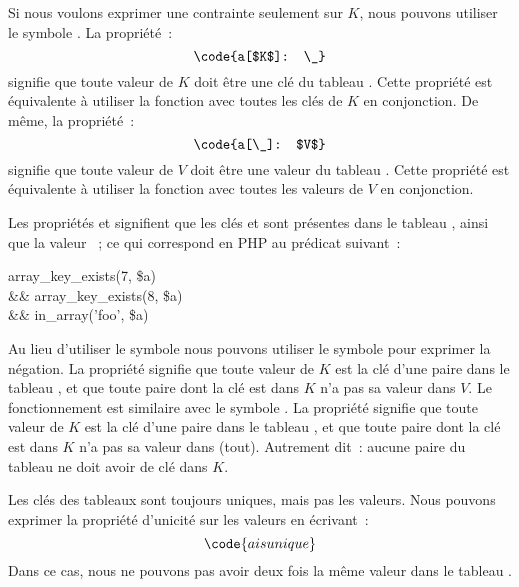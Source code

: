 Si nous voulons exprimer une contrainte seulement sur $K$, nous pouvons utiliser
le symbole \code{\_}. La propriété~:
%
$$\code{a[$K$]: \_}$$
%
signifie que toute valeur de $K$ doit être une clé du tableau . Cette
propriété est équivalente à utiliser la fonction  avec
toutes les clés de $K$ en conjonction.  De même, la propriété~:
%
$$\code{a[\_]: $V$}$$
%
signifie que toute valeur de $V$ doit être une valeur du tableau . Cette
propriété est équivalente à utiliser la fonction  avec toutes
les valeurs de $V$ en conjonction.

\begin{example}

Les propriétés  et  signifient que les clés
 et  sont présentes dans le tableau , ainsi que la
valeur ~; ce qui correspond en PHP au prédicat suivant~:
%
\begin{pre}
   array\_key\_exists(7, \$a) \\
\&\& array\_key\_exists(8, \$a) \\
\&\& in\_array('foo', \$a)
\end{pre}

\end{example}

Au lieu d'utiliser le symbole \code{:} nous pouvons utiliser le symbole
\code{!:} pour exprimer la négation. La propriété  signifie
que toute valeur de $K$ est la clé d'une paire dans le tableau , et que
toute paire dont la clé est dans $K$ n'a pas sa valeur dans $V$. Le
fonctionnement est similaire avec le symbole \code{\_}. La propriété
 signifie que toute valeur de $K$ est la clé d'une paire dans
le tableau , et que toute paire dont la clé est dans $K$ n'a pas sa
valeur dans \code{\_} (tout). Autrement dit~: aucune paire du tableau 
ne doit avoir de clé dans $K$.

Les clés des tableaux sont toujours uniques, mais pas les valeurs. Nous pouvons
exprimer la propriété d'unicité sur les valeurs en écrivant~:
%
$$\code{a is unique}$$
%
Dans ce cas, nous ne pouvons pas avoir deux fois la même valeur dans le tableau
.

